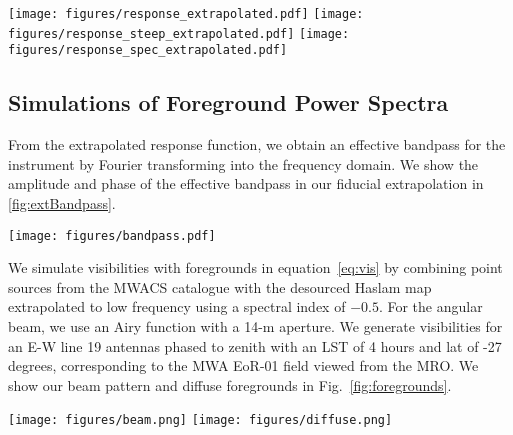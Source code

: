 \documentclass[useAMS,usenatbib]{mn2e}
\begin{document}
\begin{figure*}
\texttt{[image: figures/response\_extrapolated.pdf]}
\texttt{[image: figures/response\_steep\_extrapolated.pdf]}
\texttt{[image: figures/response\_spec\_extrapolated.pdf]}
\caption{Here we show the envelope of the magnitude of the response function convolved with a Blackman-Harris filter with FWHM $100$\,MHz centered at $150$\,MHz (blue points). We extend the simulation to arbitrary delays by copying the reflection structure from the simulation multiplied by an exponential (thick black line) to get the red line. We test the robustness of our predictions by decreasing the time constant by a factor of 3 (middle) and also scaling the simulated magnitudes by a power law so that they exactly meet the -60dB at 60\,ns spec (right).}
\label{fig:extrapolated}
\end{figure*}

\subsection{Simulations of Foreground Power Spectra}

From the extrapolated response function, we obtain an effective bandpass for the instrument by Fourier transforming into the frequency domain. We show the amplitude and phase of the effective bandpass in our fiducial extrapolation in \ref{fig:extBandpass}.


\begin{figure*}
\texttt{[image: figures/bandpass.pdf]}
\caption{The bandpass between 100 and 200\,MHz calculated by taking the FFT of the 100\,MHz Blackman-Harris filtered response function extrapolated to $100\mu$s. }
\label{fig:extBandpass}
\end{figure*}


 We simulate visibilities with foregrounds in equation~\ref{eq:vis} by combining point sources from the MWACS catalogue \citep{HurleyWalker:2014} with the desourced Haslam map \citep{Remazeilles:2015} extrapolated to low frequency using a spectral index of $-0.5$. For the angular beam, we use an Airy function with a 14-m aperture. We generate visibilities for an E-W line 19 antennas phased to zenith with an LST of 4 hours and lat of -27 degrees, corresponding to the MWA EoR-01 field viewed from the MRO. We show our beam pattern and diffuse foregrounds in Fig.~\ref{fig:foregrounds}. 

\begin{figure*}
\texttt{[image: figures/beam.png]}
\texttt{[image: figures/diffuse.png]}
\caption{The Airy primary beam used in these simulations (left) along with the diffuse foregrounds (right).}
\label{fig:foregrounds}
\end{figure*}
\end{document}
